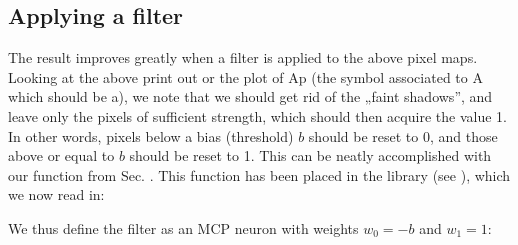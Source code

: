 \documentclass[a4paper,12pt,polish]{jupyterBook}
\begin{document}
\subsection{Applying a filter}
\label{\detokenize{docs/memory:applying-a-filter}}
\sphinxAtStartPar
The result improves greatly when a filter is applied to the above pixel maps. Looking at the above print out or the plot of Ap (the symbol associated to A which should be a), we note that we should get rid of the „faint shadows”, and leave only the pixels of sufficient strength, which should then acquire the value 1. In other words, pixels below a bias (threshold) \(b\) should be reset to 0, and those above or equal to \(b\) should be reset to 1. This can be neatly accomplished with our  function from Sec. {\hyperref[\detokenize{docs/mcp:mcp-p-lab}]{}}. This function has been placed in the library  (see {\hyperref[\detokenize{docs/appendix:app-lab}]{}}), which we now read in:
\begin{sphinxVerbatimInput}

\begin{sphinxVerbatim}[commandchars=\\\{\}]
  
 

    
\end{sphinxVerbatim}
\end{sphinxVerbatimInput}

\sphinxAtStartPar
We thus define the filter as an MCP neuron with weights \(w_0=-b\) and \(w_1=1\):
\begin{sphinxVerbatimInput}

\begin{sphinxVerbatim}[commandchars=\\\{\}]
  
         
     \PYG{p}{[}\PYG{p}{[}\PYG{p}{[}\PYG{p}{[}\PYG{p}{]}\PYG{p}{]}\PYG{p}{[}\PYG{p}{]}    \PYG{p}{]}    \PYG{p}{]}
\end{sphinxVerbatim}
\end{sphinxVerbatimInput}
\end{document}
